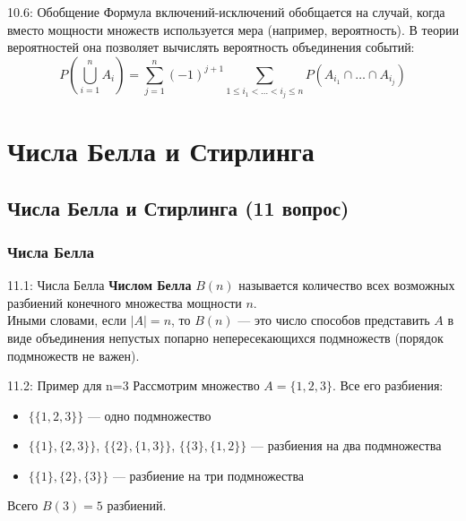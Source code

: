 \documentclass[a4paper,12pt]{article}
\begin{document}
	\begin{notebook}{10.6: Обобщение}
		Формула включений-исключений обобщается на случай, когда вместо мощности множеств используется мера (например, вероятность). В теории вероятностей она позволяет вычислять вероятность объединения событий:
		\[ P\left(\bigcup_{i=1}^n A_i\right) = \sum_{j=1}^n (-1)^{j+1} \sum_{1 \le i_1 < \dots < i_j \le n} P(A_{i_1} \cap \dots \cap A_{i_j}) \]
	\end{notebook}
	
	
	
	
	
	
	
	
	
	
	
	
	
	
	\newpage
	\section{Числа Белла и Стирлинга}
	
	\subsection{Числа Белла и Стирлинга (11 вопрос)}
	
	\subsubsection{Числа Белла}
	
	\begin{definitionbox}{11.1: Числа Белла}
		\textbf{Числом Белла} \(B(n)\) называется количество всех возможных разбиений конечного множества мощности \(n\).\\
		
		Иными словами, если \(|A| = n\), то \(B(n)\) — это число способов представить \(A\) в виде объединения непустых попарно непересекающихся подмножеств (порядок подмножеств не важен).
	\end{definitionbox}
	
	\begin{examplebox}{11.2: Пример для n=3}
		Рассмотрим множество \(A = \{1,2,3\}\). Все его разбиения:
		\begin{itemize}
			\item \(\{\{1,2,3\}\}\) — одно подмножество
			\item \(\{\{1\}, \{2,3\}\}\), \(\{\{2\}, \{1,3\}\}\), \(\{\{3\}, \{1,2\}\}\) — разбиения на два подмножества
			\item \(\{\{1\}, \{2\}, \{3\}\}\) — разбиение на три подмножества
		\end{itemize}
		Всего \(B(3) = 5\) разбиений.
	\end{examplebox}
	
\end{document}
